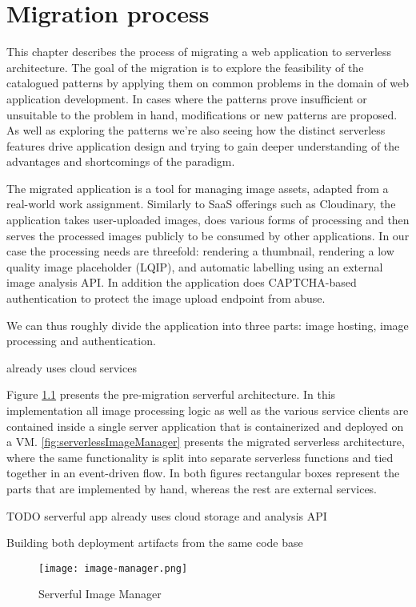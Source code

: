 \chapter{Migration process}

This chapter describes the process of migrating a web application to serverless architecture. The goal of the migration is to explore the feasibility of the catalogued patterns by applying them on common problems in the domain of web application development. In cases where the patterns prove insufficient or unsuitable to the problem in hand, modifications or new patterns are proposed. As well as exploring the patterns we're also seeing how the distinct serverless features drive application design and trying to gain deeper understanding of the advantages and shortcomings of the paradigm.

The migrated application is a tool for managing image assets, adapted from a real-world work assignment. Similarly to SaaS offerings such as Cloudinary, the application takes user-uploaded images, does various forms of processing and then serves the processed images publicly to be consumed by other applications. In our case the processing needs are threefold: rendering a thumbnail, rendering a low quality image placeholder (LQIP), and automatic labelling using an external image analysis API. In addition the application does CAPTCHA-based authentication to protect the image upload endpoint from abuse.

We can thus roughly divide the application into three parts: image hosting, image processing and authentication.

already uses cloud services

Figure \ref{fig:imageManager} presents the pre-migration serverful architecture. In this implementation all image processing logic as well as the various service clients are contained inside a single server application that is containerized and deployed on a VM. \ref{fig:serverlessImageManager} presents the migrated serverless architecture, where the same functionality is split into separate serverless functions and tied together in an event-driven flow. In both figures rectangular boxes represent the parts that are implemented by hand, whereas the rest are external services.

TODO serverful app already uses cloud storage and analysis API

Building both deployment artifacts from the same code base

\begin{figure}[h]
  \centering
  \texttt{[image: image-manager.png]}
  \caption{Serverful Image Manager}
  \label{fig:imageManager}
\end{figure}


